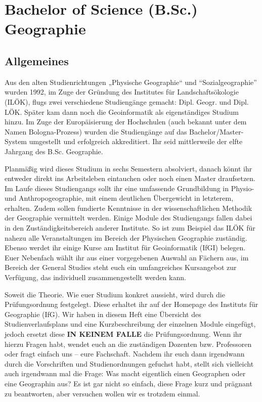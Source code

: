 \chapter{Bachelor of Science (B.Sc.) Geographie}

\section{Allgemeines}
Aus den alten Studienrichtungen „Physische Geographie“ und "`Sozialgeographie"' wurden 1992, im Zuge der Gründung des Institutes für Landschaftsökologie (ILÖK), flugs zwei verschiedene Studiengänge gemacht: Dipl. Geogr. und Dipl. LÖK. Später kam dann noch die Geoinformatik als eigenständiges Studium hinzu. Im Zuge der Europäisierung der Hochschulen (auch bekannt unter dem Namen Bologna-Prozess) wurden die Studiengänge auf das Bachelor/Master-System umgestellt und erfolgreich akkreditiert. Ihr seid mittlerweile der elfte Jahrgang des B.Sc. Geographie.

Planmäßig wird dieses Studium in sechs Semestern absolviert, danach könnt ihr entweder direkt ins Arbeitsleben eintauchen oder noch einen Master draufsetzen. Im Laufe dieses Studiengangs sollt ihr eine umfassende Grundbildung in Physio- und Anthropogeographie, mit einem deutlichen Übergewicht in letzterem, erhalten. Zudem sollen fundierte Kenntnisse in der wissenschaftlichen Methodik der Geographie vermittelt werden. Einige Module des Studiengangs fallen dabei in den Zuständigkeitsbereich anderer Institute. So ist zum Beispiel das ILÖK für nahezu alle Veranstaltungen im Bereich der Physischen Geographie zuständig. Ebenso werdet ihr einige Kurse am Institut für Geoinformatik (IfGI) belegen. Euer Nebenfach wählt ihr aus einer vorgegebenen Auswahl an Fächern aus, im Bereich der General Studies steht euch ein umfangreiches Kursangebot zur Verfügung, das individuell zusammengestellt werden kann.

Soweit die Theorie. Wie euer Studium konkret aussieht, wird durch die Prüfungsordnung festgelegt. Diese erhaltet ihr auf der Homepage des Instituts für Geographie (IfG). Wir haben in diesem Heft eine Übersicht des Studienverlaufsplans und eine Kurzbeschreibung der einzelnen Module eingefügt, jedoch ersetzt diese \textbf{IN KEINEM FALLE} die Prüfungsordnung. Wenn ihr hierzu Fragen habt, wendet euch an die zuständigen Dozenten bzw. Professoren oder fragt einfach uns – eure Fachschaft. Nachdem ihr euch dann irgendwann durch die Vorschriften und Studienordnungen gefuchst habt, stellt sich vielleicht auch irgendwann mal die Frage: Was macht eigentlich einen Geographen oder eine Geographin aus? Es ist gar nicht so einfach, diese Frage kurz und prägnant zu beantworten, aber versuchen wollen wir es trotzdem einmal.

